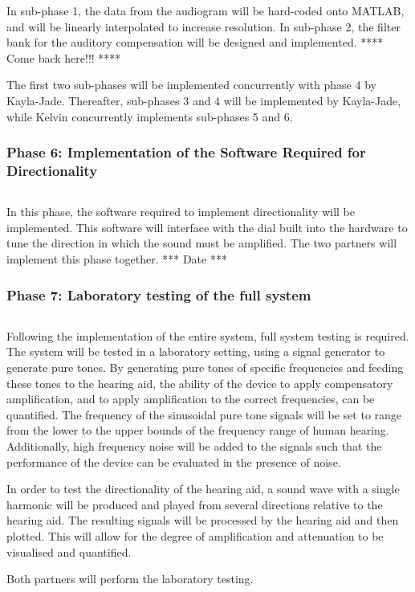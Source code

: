 \documentclass[10pt,twocolumn]{witseiepaper}
\begin{document}
In sub-phase 1, the data from the audiogram will be hard-coded onto MATLAB, and will be linearly interpolated to increase resolution. In sub-phase 2, the filter bank for the auditory compensation will be designed and implemented. 
**** Come back here!!! ****

The first two sub-phases will be implemented concurrently with phase 4 by Kayla-Jade. Thereafter, sub-phases 3 and 4 will be implemented by Kayla-Jade, while Kelvin concurrently implements sub-phases 5 and 6.


\subsubsection*{Phase 6: Implementation of the Software Required for Directionality} $    $

In this phase, the software required to implement directionality will be implemented. This software will interface with the dial built into the hardware to tune the direction in which the sound must be amplified. The two partners will implement this phase together. 
*** Date ***

\subsubsection*{Phase 7: Laboratory testing of the full system} $    $

Following the implementation of the entire system, full system testing is required. The system will be tested in a laboratory setting, using a signal generator to generate pure tones. By generating pure tones of specific frequencies and feeding these tones to the hearing aid, the ability of the device to apply compensatory amplification, and to apply amplification to the correct frequencies, can be quantified. The frequency of the sinusoidal pure tone signals will be set to range from the lower to the upper bounds of the frequency range of human hearing. Additionally, high frequency noise will be added to the signals such that the performance of the device can be evaluated in the presence of noise.

In order to test the directionality of the hearing aid, a sound wave with a single harmonic will be produced and played from several directions relative to the hearing aid. The resulting signals will be processed by the hearing aid and then plotted. This will allow for the degree of amplification and attenuation to be visualised and quantified.

Both partners will perform the laboratory testing.
\end{document}

